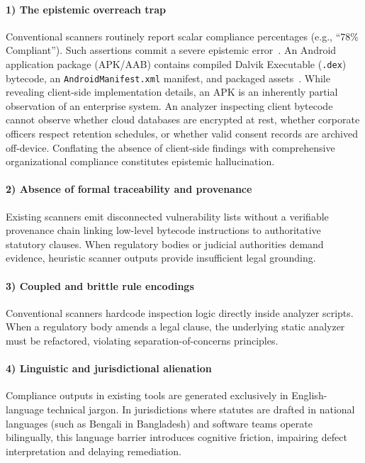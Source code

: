 \paragraph{1) The epistemic overreach trap} Conventional scanners routinely report scalar compliance percentages (e.g., ``78\% Compliant''). Such assertions commit a severe epistemic error~\cite{fagin_epistemic_logic}. An Android application package (APK/AAB) contains compiled Dalvik Executable (\texttt{.dex}) bytecode, an \texttt{AndroidManifest.xml} manifest, and packaged assets~\cite{enck_android_study}. While revealing client-side implementation details, an APK is an inherently partial observation of an enterprise system. An analyzer inspecting client bytecode cannot observe whether cloud databases are encrypted at rest, whether corporate officers respect retention schedules, or whether valid consent records are archived off-device. Conflating the absence of client-side findings with comprehensive organizational compliance constitutes epistemic hallucination.

\paragraph{2) Absence of formal traceability and provenance} Existing scanners emit disconnected vulnerability lists without a verifiable provenance chain linking low-level bytecode instructions to authoritative statutory clauses. When regulatory bodies or judicial authorities demand evidence, heuristic scanner outputs provide insufficient legal grounding.

\paragraph{3) Coupled and brittle rule encodings} Conventional scanners hardcode inspection logic directly inside analyzer scripts. When a regulatory body amends a legal clause, the underlying static analyzer must be refactored, violating separation-of-concerns principles.

\paragraph{4) Linguistic and jurisdictional alienation} Compliance outputs in existing tools are generated exclusively in English-language technical jargon. In jurisdictions where statutes are drafted in national languages (such as Bengali in Bangladesh) and software teams operate bilingually, this language barrier introduces cognitive friction, impairing defect interpretation and delaying remediation.

